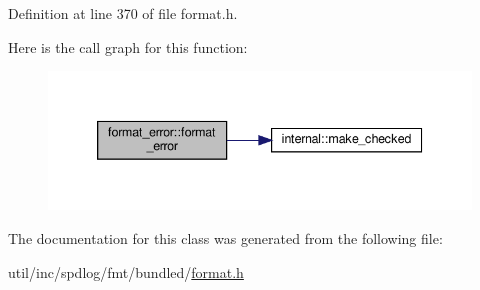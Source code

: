Definition at line 370 of file format.\+h.

Here is the call graph for this function\+:
\nopagebreak
\begin{figure}[H]
\begin{center}
\leavevmode
\includegraphics[width=339pt]{classformat__error_aec9d9c4e34320e130463abaf4dc4f200_cgraph}
\end{center}
\end{figure}


The documentation for this class was generated from the following file\+:\begin{DoxyCompactItemize}
\item 
util/inc/spdlog/fmt/bundled/\hyperlink{format_8h}{format.\+h}\end{DoxyCompactItemize}
